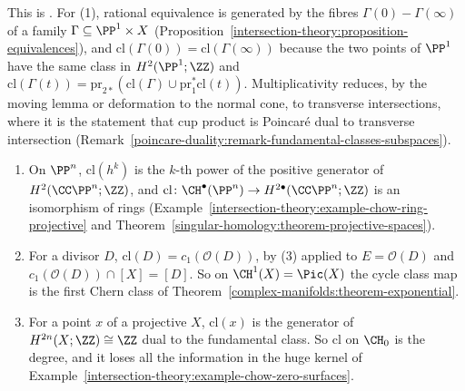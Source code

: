 This is \cite[Chapter 19]{fulton-intersection}. For (1), rational equivalence is generated by the fibres $\Gamma(0) - \Gamma(\infty)$ of a family
$\Gamma \subseteq \PP^1 \times X$ (Proposition~\ref{intersection-theory:proposition-equivalences}), and $\mathrm{cl}(\Gamma(0)) = \mathrm{cl}(\Gamma(\infty))$ because the two points of $\PP^1$
have the same class in $H^2(\PP^1; \ZZ)$ and $\mathrm{cl}(\Gamma(t)) = \mathrm{pr}_{2*}(\mathrm{cl}(\Gamma) \cup \mathrm{pr}_1^*\mathrm{cl}(t))$. Multiplicativity reduces, by the moving lemma or
deformation to the normal cone, to transverse intersections, where it is the statement that cup product is Poincar\'e dual to transverse intersection
(Remark~\ref{poincare-duality:remark-fundamental-classes-subspaces}).

\begin{example}\label{intersection-theory:example-classes}
\begin{enumerate}
\item On $\PP^n$, $\mathrm{cl}(h^k)$ is the $k$-th power of the positive generator of $H^2(\CC\PP^n; \ZZ)$, and $\mathrm{cl} \colon \CH^\bullet(\PP^n) \to H^{2\bullet}(\CC\PP^n; \ZZ)$ is an isomorphism of
rings (Example~\ref{intersection-theory:example-chow-ring-projective} and Theorem~\ref{singular-homology:theorem-projective-spaces}).
\item For a divisor $D$, $\mathrm{cl}(D) = c_1(\mathcal{O}(D))$, by (3) applied to $E = \mathcal{O}(D)$ and $c_1(\mathcal{O}(D)) \cap [X] = [D]$. So on $\CH^1(X) = \Pic(X)$ the cycle class map is the first
Chern class of Theorem~\ref{complex-manifolds:theorem-exponential}.
\item For a point $x$ of a projective $X$, $\mathrm{cl}(x)$ is the generator of $H^{2n}(X; \ZZ) \cong \ZZ$ dual to the fundamental class. So $\mathrm{cl}$ on $\CH_0$ is the degree, and it loses all the
information in the huge kernel of Example~\ref{intersection-theory:example-chow-zero-surfaces}.
\end{enumerate}
\end{example}

